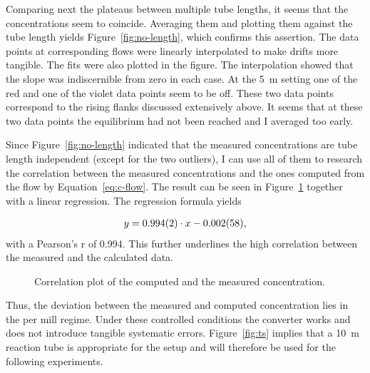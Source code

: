 Comparing next the  plateaus between multiple tube lengths, it
seems that the concentrations seem to coincide. Averaging them and
plotting them against the tube length yields
Figure~\ref{fig:no-length}, which confirms this assertion. The data
points at corresponding flows were linearly interpolated to make
drifts more tangible. The fits were also plotted in the figure. The
interpolation showed that the slope was indiscernible from zero in
each case. At the \SI{5}{\meter} setting one of the red and one of the
violet data points seem to be off. These two data points correspond to
the rising flanks discussed extensively above. It seems that at these
two data points the equilibrium had not been reached and I averaged
too early.

Since Figure~\ref{fig:no-length} indicated that the measured
concentrations are tube length independent (except for the two
outliers), I can use all of them to research the correlation between
the measured concentrations and the ones computed from the flow by
Equation~\eqref{eq:c-flow}. The result can be seen in
Figure~\ref{fig:no-calib} together with a linear regression. The
regression formula yields

\begin{align*}
  y = \num{0.994 \pm 0.002}  \cdot x -\num{0.002 \pm 0.058},
\end{align*}
with a Pearson's r of 0.994. This further underlines the high
correlation between the measured and the calculated data.

\begin{figure}[htbp]
  \centering
  
  \caption{Correlation plot of the computed and the measured 
    concentration.}
  \label{fig:no-calib}
\end{figure}

Thus, the deviation between the measured and computed concentration
lies in the per mill regime. Under these controlled conditions the
converter works and does not introduce tangible systematic
errors. Figure~\ref{fig:ts} implies that a \SI{10}{\meter} reaction
tube is appropriate for the setup and will therefore be used for the
following experiments.

